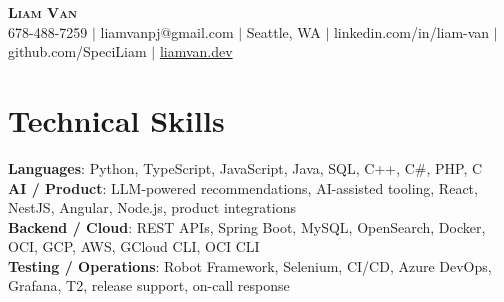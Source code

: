 \documentclass[letterpaper,11pt]{article}
\begin{document}

%
\begin{center}
    \textbf{\Huge \scshape Liam Van} \\ \vspace{1pt}
    \small 678-488-7259 $|$ liamvanpj@gmail.com $|$ Seattle, WA $|$
    linkedin.com/in/liam-van $|$ github.com/SpeciLiam $|$ \href{https://liamvan.dev}{liamvan.dev}

\end{center}

\section{Technical Skills}
 \begin{itemize}[leftmargin=0.15in, label={}]
    \small{\item{
     \textbf{Languages}{: Python, TypeScript, JavaScript, Java, SQL, C++, C\#, PHP, C} \\
     \textbf{AI / Product}{: LLM-powered recommendations, AI-assisted tooling, React, NestJS, Angular, Node.js, product integrations} \\
     \textbf{Backend / Cloud}{: REST APIs, Spring Boot, MySQL, OpenSearch, Docker, OCI, GCP, AWS, GCloud CLI, OCI CLI} \\
     \textbf{Testing / Operations}{: Robot Framework, Selenium, CI/CD, Azure DevOps, Grafana, T2, release support, on-call response} \\
    }}
 \end{itemize}
%

\end{document}
